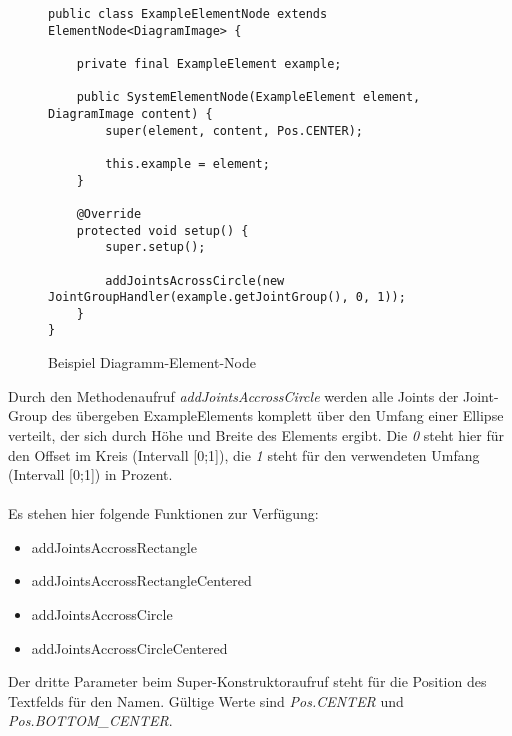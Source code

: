 \begin{figure}[H]
	\centering
	\begin{lstlisting}
public class ExampleElementNode extends ElementNode<DiagramImage> {

    private final ExampleElement example;

    public SystemElementNode(ExampleElement element, DiagramImage content) {
        super(element, content, Pos.CENTER);

        this.example = element;
    }

    @Override
    protected void setup() {
        super.setup();

        addJointsAcrossCircle(new JointGroupHandler(example.getJointGroup(), 0, 1));
    }
}
	\end{lstlisting}
	\caption{Beispiel Diagramm-Element-Node}
\end{figure}
Durch den Methodenaufruf \textit{addJointsAccrossCircle} werden alle Joints der Joint-Group des übergeben
ExampleElements komplett über den Umfang einer Ellipse verteilt, der sich durch Höhe und Breite des Elements
ergibt. Die \textit{0} steht hier für den Offset im Kreis (Intervall [0;1]), die \textit{1} steht für den
verwendeten Umfang (Intervall [0;1]) in Prozent.
\\
\\
Es stehen hier folgende Funktionen zur Verfügung:
\begin{itemize}
	\item addJointsAccrossRectangle
	\item addJointsAccrossRectangleCentered
	\item addJointsAccrossCircle
	\item addJointsAccrossCircleCentered
\end{itemize}
Der dritte Parameter beim Super-Konstruktoraufruf steht für die Position des Textfelds für den Namen. Gültige
Werte sind \textit{Pos.CENTER} und \textit{Pos.BOTTOM\_CENTER}.

